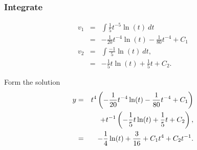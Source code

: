 \begin{frame}
  \frametitle{Integrate}

  \begin{eqnarray*}
    v_1 & = & \int \frac{1}{5} t^{-5} \ln(t) ~ dt  \\
    & = & -\frac{1}{20} t^{-4} \ln(t) - \frac{1}{80} t^{-4} + C_1 \\
    v_2 & = & \int \frac{-1}{5} \ln(t) ~ dt, \\
    & = & -\frac{1}{5} t \ln(t) + \frac{1}{5} t + C_2.
  \end{eqnarray*}

  Form the solution
  \begin{eqnarray*}
    y & = & t^4 \left( -\frac{1}{20} t^{-4} \ln(t) - \frac{1}{80} t^{-4} + C_1 \right) \\
    & & + t^{-1} \left( -\frac{1}{5} t \ln(t) + \frac{1}{5} t + C_2 \right), \\
    & = & -\frac{1}{4} \ln(t) + \frac{3}{16} + C_1 t^4 + C_2 t^{-1}.
  \end{eqnarray*}

\end{frame}


